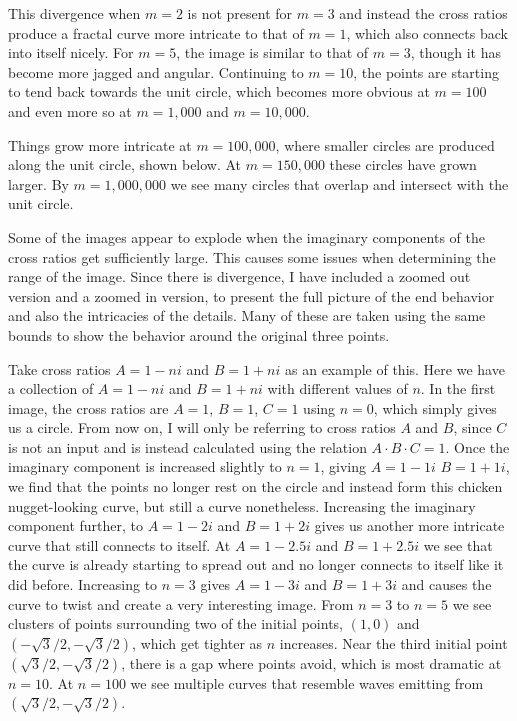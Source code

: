 \documentclass[12pt,a4paper,reqno,parskip=full]{amsart}
\numberwithin{equation}{section}
\theoremstyle{plain}
\theoremstyle{definition}
\begin{document}
This divergence when $m=2$ is not present for $m=3$ and instead the cross ratios produce a fractal curve more intricate to that of $m=1$, which also connects back into itself nicely. For $m=5$, the image is similar to that of $m=3$, though it has become more jagged and angular. Continuing to $m=10$, the points are starting to tend back towards the unit circle, which becomes more obvious at $m=100$ and even more so at $m=1,000$ and $m=10,000$.

Things grow more intricate at $m=100,000$, where smaller circles are produced along the unit circle, shown below. At $m=150,000$ these circles have grown larger. By $m=1,000,000$ we see many circles that overlap and intersect with the unit circle.

Some of the images appear to explode when the imaginary components of the cross ratios get sufficiently large. This causes some issues when determining the range of the image. Since there is divergence, I have included a zoomed out version and a zoomed in version, to present the full picture of the end behavior and also the intricacies of the details. Many of these are taken using the same bounds to show the behavior around the original three points.

Take cross ratios $A=1-ni$ and $B=1+ni$ as an example of this. Here we have a collection of $A=1-ni$ and $B=1+ni$ with different values of $n$. In the first image, the cross ratios are $A=1$, $B=1$, $C=1$ using $n=0$, which simply gives us a circle. From now on, I will only be referring to cross ratios $A$ and $B$, since $C$ is not an input and is instead calculated using the relation $A\cdot B\cdot C=1$. Once the imaginary component is increased slightly to $n=1$, giving $A=1-1i$ $B=1+1i$, we find that the points no longer rest on the circle and instead form this chicken nugget-looking curve, but still a curve nonetheless. Increasing the imaginary component further, to $A=1-2i$ and $B=1+2i$ gives us another more intricate curve that still connects to itself. At $A=1-2.5i$ and $B=1+2.5i$ we see that the curve is already starting to spread out and no longer connects to itself like it did before. Increasing to $n=3$ gives $A=1-3i$ and $B=1+3i$ and causes the curve to twist and create a very interesting image. From $n=3$ to $n=5$ we see clusters of points surrounding two of the initial points, $(1,0)$ and $(-\sqrt3/2,-\sqrt3/2)$, which get tighter as $n$ increases. Near the third initial point $(\sqrt3/2,-\sqrt3/2)$, there is a gap where points avoid, which is most dramatic at $n=10$. At $n=100$ we see multiple curves that resemble waves emitting from $(\sqrt3/2,-\sqrt3/2)$.
\end{document}
